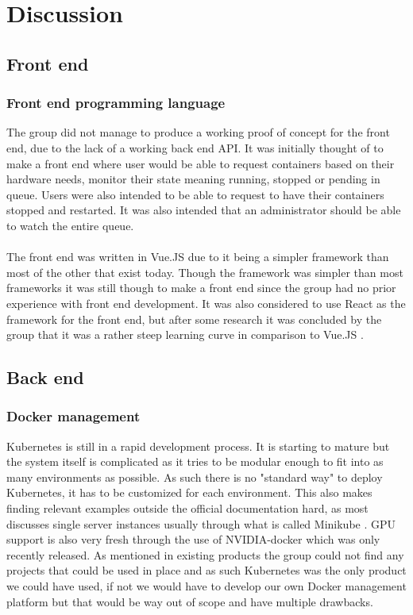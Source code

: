 \documentclass[../main.tex]{subfiles}
\begin{document}
\renewcommand{\baselinestretch}{1.5}

\chapter{Discussion}
\section{Front end}
\subsection*{Front end programming language}
The group did not manage to produce a working proof of concept for the front end, due to the lack of a working back end API.
It was initially thought of to make a front end where user would be able to request containers based on their hardware needs, monitor their state meaning running, stopped or pending in queue. Users were also intended to be able to request to have their containers stopped and restarted. It was also intended that an administrator should be able to watch the entire queue.\\\\


The front end was written in Vue.JS due to it being a simpler framework than most of the other that exist today. Though the framework was simpler than most frameworks it was still though to make a front end since the group had no prior experience with front end development. It was also considered to use React as the framework for the front end, but after some research it was concluded by the group that it was a rather steep learning curve in comparison to Vue.JS .



\section{Back end}
\subsection*{Docker management}
Kubernetes is still in a rapid development process. It is starting to mature but the system itself is complicated as it tries to be modular enough to fit into as many environments as possible. As such there is no "standard way" to deploy Kubernetes, it has to be customized for each environment. This also makes finding relevant examples outside the official documentation hard, as most discusses single server instances usually through what is called Minikube \cite{minikube}. GPU support is also very fresh through the use of NVIDIA-docker  which was only recently released. As mentioned in existing products the group could not find any projects that could be used in place and as such Kubernetes was the only product we could have used, if not we would have to develop our own Docker management platform but that would be way out of scope and have multiple drawbacks.
\end{document}
